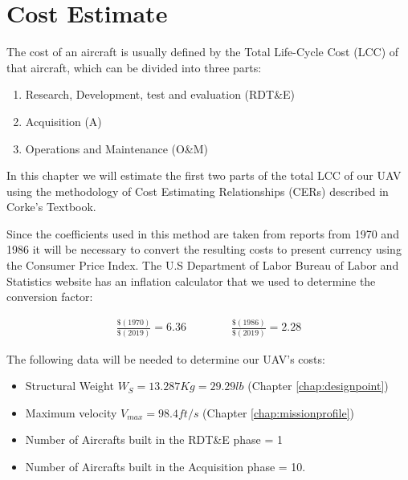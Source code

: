 \documentclass[english,fira]{ist-report}
\begin{document}
{%
\setcounter{topnumber}{4}
\setcounter{bottomnumber}{1}
\setcounter{totalnumber}{5}

\chapter{Cost Estimate}

The cost of an aircraft is usually defined by the Total Life-Cycle Cost (LCC) of that aircraft, which can be divided into three parts:
\begin{enumerate}
    \item Research, Development, test and evaluation (RDT\&E)
    \item Acquisition (A)
    \item Operations and Maintenance (O\&M)
\end{enumerate}
    
In this chapter we will estimate the first two parts of the total LCC of our UAV using the methodology of Cost Estimating Relationships (CERs) described in Corke’s Textbook. \par
Since the coefficients used in this method are taken from reports from 1970 and 1986 it will be necessary to convert the resulting costs to present currency using the Consumer Price Index. The U.S Department of Labor Bureau of Labor and Statistics website \cite{cpicalc} has an inflation calculator that we used to determine the conversion factor:


\begin{gather} \label{eq:2presentcurrency}
    \frac{\$(\text{1970})}{\$(\text{2019})} = 6.36 \qquad\qquad \frac{\$(\text{1986})}{\$(\text{2019})} = 2.28
\end{gather}


The following data will be needed to determine our UAV’s costs:
\begin{itemize}
    \item Structural Weight $W_S=13.287Kg=29.29lb$ (Chapter \ref{chap:designpoint})
    \item Maximum velocity $V_{max}=98.4ft/s$ (Chapter  \ref{chap:missionprofile})
    \item Number of Aircrafts built in the RDT\&E phase = 1
    \item Number of Aircrafts built in the Acquisition phase = 10.
\end{itemize}
%
}
\end{document}
